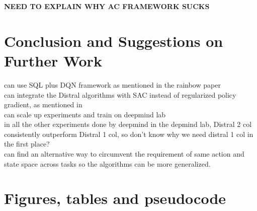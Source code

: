 \documentclass[12pt]{report}
\begin{document}
\textbf{NEED TO EXPLAIN WHY AC FRAMEWORK SUCKS}








\chapter{Conclusion and Suggestions on Further Work}

can use SQL plus DQN framework as mentioned in the rainbow paper \cite{hessel2018rainbow}\\

can integrate the Distral algorithms with SAC instead of regularized policy gradient, as mentioned in \cite{haarnoja2018soft}\\

can scale up experiments and train on deepmind lab\\

in all the other experiments done by deepmind in the depmind lab, Distral 2 col consistently outperform Distral 1 col, so don't know why we need distral 1 col in the first place?\\

can find an alternative way to circumvent the requirement of same action and state space across tasks so the algorithms can be more generalized.

\appendix




\chapter{Figures, tables and pseudocode}
\end{document}
